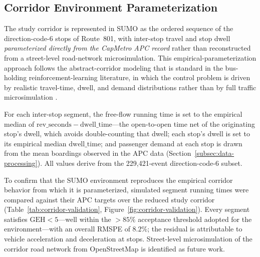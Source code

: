 
\subsection{Corridor Environment Parameterization}
\label{subsec:corridor-parameterization}
The study corridor is represented in SUMO as the ordered sequence of the
direction-code-6 stops of Route~801, with inter-stop travel and stop dwell
\emph{parameterized directly from the CapMetro APC record} rather than
reconstructed from a street-level road-network microsimulation. This
empirical-parameterization approach follows the abstract-corridor modeling that
is standard in the bus-holding reinforcement-learning literature, in which the
control problem is driven by realistic travel-time, dwell, and demand
distributions rather than by full traffic microsimulation
\cite{Wangsun,Rodriguez2023Cooperative}.

For each inter-stop segment, the free-flow running time is set to the empirical
median of $\mathrm{rev\_seconds}-\mathrm{dwell\_time}$---the open-to-open time
net of the originating stop's dwell, which avoids double-counting that dwell;
each stop's dwell is set to its empirical median $\mathrm{dwell\_time}$; and
passenger demand at each stop is drawn from the mean boardings observed in the
APC data (Section~\ref{subsec:data-processing}). All values derive from the
229{,}421-event direction-code-6 subset.

To confirm that the SUMO environment reproduces the empirical corridor behavior
from which it is parameterized, simulated segment running times were compared
against their APC targets over the reduced study corridor
(Table~\ref{tab:corridor-validation}, Figure~\ref{fig:corridor-validation}).
Every segment satisfies $\mathrm{GEH}<5$---well within the $>\!85\%$ acceptance
threshold adopted for the environment---with an overall RMSPE of $8.2\%$; the
residual is attributable to vehicle acceleration and deceleration at stops.
Street-level microsimulation of the corridor road network from OpenStreetMap is
identified as future work.

